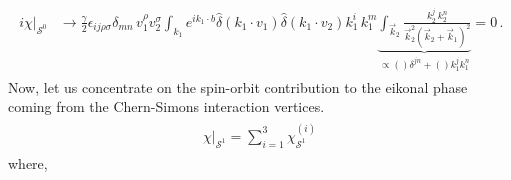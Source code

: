 \begin{align}
\begin{split}
i\chi\Big|_{\mathcal{S}^0}&
    \to\frac{\gamma}{2}\epsilon_{i j\rho\sigma}\delta_{mn}\,v_1^\rho v_2^\sigma\int_{k_1}e^{ik_1\cdot b}{\hat\delta(k_1\cdot v_1)\hat\delta(k_1\cdot v_2)k_1^i\,k_1^{m}}\underbrace{\int_{\vec k_2}\frac{k_2^j \,k_2^n}{\vec k_2^2(\vec k_2+\vec k_1)^2}}_{\propto ()\delta^{jn}+()k_1^j k_1^n}=0\,.\label{3.79}
    \end{split}
\end{align}
%
Now, let us concentrate on the spin-orbit contribution to the eikonal phase coming from the Chern-Simons interaction vertices. %
\begin{align}
    \begin{split}
        \chi\Big|_{\mathcal{S}^1}=\sum_{i=1}^{3}\chi_{\mathcal{S}^1}^{(i)}
    \end{split}
\end{align}
where,

